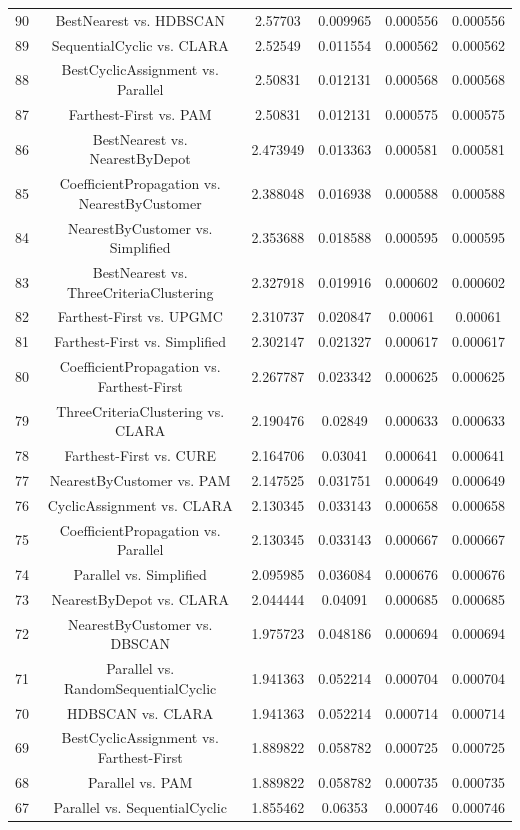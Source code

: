 \documentclass[a4paper,10pt]{article}
\begin{document}
\begin{landscape}
\begin{table}[!htp]
\begin{tabular}{cccccc}
90&BestNearest vs. HDBSCAN&2.57703&0.009965&0.000556&0.000556\\
89&SequentialCyclic vs. CLARA&2.52549&0.011554&0.000562&0.000562\\
88&BestCyclicAssignment vs. Parallel&2.50831&0.012131&0.000568&0.000568\\
87&Farthest-First vs. PAM&2.50831&0.012131&0.000575&0.000575\\
86&BestNearest vs. NearestByDepot&2.473949&0.013363&0.000581&0.000581\\
85&CoefficientPropagation vs. NearestByCustomer&2.388048&0.016938&0.000588&0.000588\\
84&NearestByCustomer vs. Simplified&2.353688&0.018588&0.000595&0.000595\\
83&BestNearest vs. ThreeCriteriaClustering&2.327918&0.019916&0.000602&0.000602\\
82&Farthest-First vs. UPGMC&2.310737&0.020847&0.00061&0.00061\\
81&Farthest-First vs. Simplified&2.302147&0.021327&0.000617&0.000617\\
80&CoefficientPropagation vs. Farthest-First&2.267787&0.023342&0.000625&0.000625\\
79&ThreeCriteriaClustering vs. CLARA&2.190476&0.02849&0.000633&0.000633\\
78&Farthest-First vs. CURE&2.164706&0.03041&0.000641&0.000641\\
77&NearestByCustomer vs. PAM&2.147525&0.031751&0.000649&0.000649\\
76&CyclicAssignment vs. CLARA&2.130345&0.033143&0.000658&0.000658\\
75&CoefficientPropagation vs. Parallel&2.130345&0.033143&0.000667&0.000667\\
74&Parallel vs. Simplified&2.095985&0.036084&0.000676&0.000676\\
73&NearestByDepot vs. CLARA&2.044444&0.04091&0.000685&0.000685\\
72&NearestByCustomer vs. DBSCAN&1.975723&0.048186&0.000694&0.000694\\
71&Parallel vs. RandomSequentialCyclic&1.941363&0.052214&0.000704&0.000704\\
70&HDBSCAN vs. CLARA&1.941363&0.052214&0.000714&0.000714\\
69&BestCyclicAssignment vs. Farthest-First&1.889822&0.058782&0.000725&0.000725\\
68&Parallel vs. PAM&1.889822&0.058782&0.000735&0.000735\\
67&Parallel vs. SequentialCyclic&1.855462&0.06353&0.000746&0.000746\\

\end{tabular}
\end{table}
\end{landscape}
\end{document}
